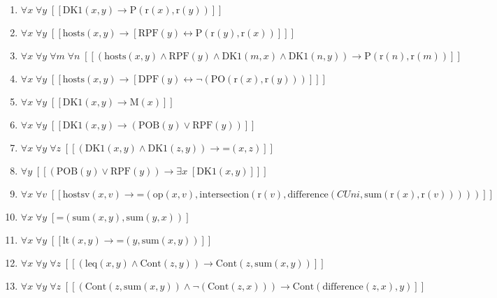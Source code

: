\documentclass{article}
\begin{document}
\begin{enumerate}
\item $\forall x\; \forall y\;  \left[ \left[ \textrm{DK1}(x,y) \rightarrow \textrm{P}(\textrm{r}(x),\textrm{r}(y)) \right] \right]$
\item $\forall x\; \forall y\;  \left[ \left[ \textrm{hosts}(x,y) \rightarrow \left[ \textrm{RPF}(y) \leftrightarrow \textrm{P}(\textrm{r}(y),\textrm{r}(x)) \right] \right] \right]$
\item $\forall x\; \forall y\; \forall m\; \forall n\;  \left[ \left[ \left(\textrm{hosts}(x,y) \land \textrm{RPF}(y) \land \textrm{DK1}(m,x) \land \textrm{DK1}(n,y)\right) \rightarrow \textrm{P}(\textrm{r}(n),\textrm{r}(m)) \right] \right]$
\item $\forall x\; \forall y\;  \left[ \left[ \textrm{hosts}(x,y) \rightarrow \left[ \textrm{DPF}(y) \leftrightarrow \neg \left(\textrm{PO}(\textrm{r}(x),\textrm{r}(y))\right) \right] \right] \right]$
\item $\forall x\; \forall y\;  \left[ \left[ \textrm{DK1}(x,y) \rightarrow \textrm{M}(x) \right] \right]$
\item $\forall x\; \forall y\;  \left[ \left[ \textrm{DK1}(x,y) \rightarrow \left(\textrm{POB}(y) \lor \textrm{RPF}(y)\right) \right] \right]$
\item $\forall x\; \forall y\; \forall z\;  \left[ \left[ \left(\textrm{DK1}(x,y) \land \textrm{DK1}(z,y)\right) \rightarrow \textrm{=}(x,z) \right] \right]$
\item $\forall y\;  \left[ \left[ \left(\textrm{POB}(y) \lor \textrm{RPF}(y)\right) \rightarrow \exists x\;  \left[ \textrm{DK1}(x,y) \right] \right] \right]$
\item $\forall x\; \forall v\;  \left[ \left[ \textrm{hostsv}(x,v) \rightarrow \textrm{=}(\textrm{op}(x,v),\textrm{intersection}(\textrm{r}(v),\textrm{difference}(CUni,\textrm{sum}(\textrm{r}(x),\textrm{r}(v))))) \right] \right]$
\item $\forall x\; \forall y\;  \left[ \textrm{=}(\textrm{sum}(x,y),\textrm{sum}(y,x)) \right]$
\item $\forall x\; \forall y\;  \left[ \left[ \textrm{lt}(x,y) \rightarrow \textrm{=}(y,\textrm{sum}(x,y)) \right] \right]$
\item $\forall x\; \forall y\; \forall z\;  \left[ \left[ \left(\textrm{leq}(x,y) \land \textrm{Cont}(z,y)\right) \rightarrow \textrm{Cont}(z,\textrm{sum}(x,y)) \right] \right]$
\item $\forall x\; \forall y\; \forall z\;  \left[ \left[ \left(\textrm{Cont}(z,\textrm{sum}(x,y)) \land \neg \left(\textrm{Cont}(z,x)\right)\right) \rightarrow \textrm{Cont}(\textrm{difference}(z,x),y) \right] \right]$

\end{enumerate}
\end{document}

